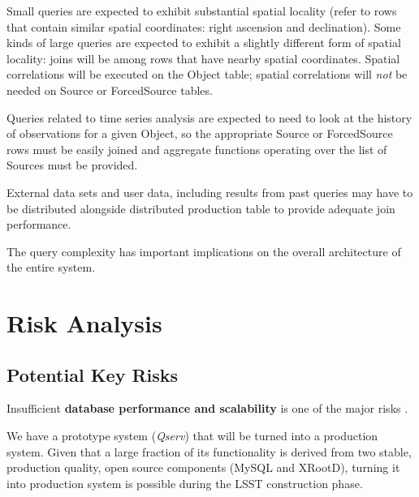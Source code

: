 \documentclass[DM,lsstdraft,toc]{lsstdoc}
\begin{document}
Small queries are expected to exhibit substantial spatial locality
(refer to rows that contain similar spatial coordinates: right ascension
and declination). Some kinds of large queries are expected to exhibit a
slightly different form of spatial locality: joins will be among rows
that have nearby spatial coordinates. Spatial correlations will be
executed on the Object table; spatial correlations will \emph{not} be
needed on Source or ForcedSource tables.

Queries related to time series analysis are expected to need to look at
the history of observations for a given Object, so the appropriate
Source or ForcedSource rows must be easily joined and aggregate
functions operating over the list of Sources must be provided.

External data sets and user data, including results from past queries
may have to be distributed alongside distributed production table to
provide adequate join performance.

The query complexity has important implications on the overall
architecture of the entire system.

\section{Risk Analysis}\label{risk-analysis}

\subsection{Potential Key Risks}\label{potential-key-risks}

Insufficient \textbf{database performance and scalability} is one of the
major risks .

We have a prototype system (\emph{Qserv}) that will be turned into a
production system. Given that a large fraction of its functionality is
derived from two stable, production quality, open source components
(MySQL and XRootD), turning it into production
system is possible during the LSST construction phase.
\end{document}
